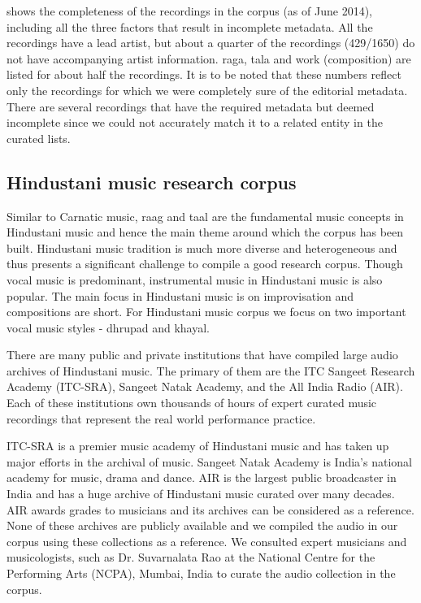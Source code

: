  shows the completeness of the recordings in the corpus (as of June 2014), including all the three factors that result in incomplete metadata. All the recordings have a lead artist, but about a quarter of the recordings (429/1650) do not have accompanying artist information. \Gls{raga}, \gls{tala} and work (composition) are listed for about half the recordings. It is to be noted that these numbers reflect only the recordings for which we were completely sure of the editorial metadata. There are several recordings that have the required metadata but deemed incomplete since we could not accurately match it to a related entity in the curated lists. 
%
\subsection{Hindustani music research corpus}\label{sec:cmhmcorpora}
Similar to Carnatic music, \gls{raag} and \gls{taal} are the fundamental music concepts in Hindustani music and hence the main theme around which the corpus has been built. Hindustani music tradition is much more diverse and heterogeneous and thus presents a significant challenge to compile a good research corpus. Though vocal music is predominant, instrumental music in Hindustani music is also popular. The main focus in Hindustani music is on improvisation and compositions are short. For Hindustani music corpus we focus on two important vocal music styles - \gls{dhrupad} and \gls{khayal}. 

There are many public and private institutions that have compiled large audio archives of Hindustani music. The primary of them are the ITC Sangeet Research Academy (ITC-SRA), Sangeet Natak Academy, and the All India Radio (AIR). Each of these institutions own thousands of hours of expert curated music recordings that represent the real world performance practice. 

ITC-SRA is a premier music academy of Hindustani music and has taken up major efforts in the archival of music. Sangeet Natak Academy is India's national academy for music, drama and dance. AIR is the largest public broadcaster in India and has a huge archive of Hindustani music curated over many decades. AIR awards grades to musicians and its archives can be considered as a reference. None of these archives are publicly available and we compiled the audio in our corpus using these collections as a reference. We consulted expert musicians and musicologists, such as Dr. Suvarnalata Rao at the National Centre for the Performing Arts (NCPA), Mumbai, India to curate the audio collection in the corpus. 


